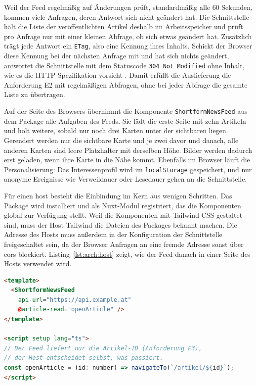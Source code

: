 Weil der Feed regelmäßig auf Änderungen prüft, standardmäßig alle 60 Sekunden, kommen viele Anfragen, deren Antwort sich nicht geändert hat.
Die Schnittstelle hält die Liste der veröffentlichten Artikel deshalb im Arbeitsspeicher und prüft pro Anfrage nur mit einer kleinen Abfrage, ob sich etwas geändert hat.
Zusätzlich trägt jede Antwort ein \texttt{ETag}, also eine Kennung ihres Inhalts.
Schickt der Browser diese Kennung bei der nächsten Anfrage mit und hat sich nichts geändert, antwortet die Schnittstelle mit dem Statuscode \texttt{304 Not Modified} ohne Inhalt, wie es die HTTP-Spezifikation vorsieht \cite{rfc9110}.
Damit erfüllt die Auslieferung die Anforderung E2 mit regelmäßigen Abfragen, ohne bei jeder Abfrage die gesamte Liste zu übertragen.

Auf der Seite des Browsers übernimmt die Komponente \texttt{ShortformNewsFeed} aus dem Package alle Aufgaben des Feeds.
Sie lädt die erste Seite mit zehn Artikeln und holt weitere, sobald nur noch drei Karten unter der sichtbaren liegen.
Gerendert werden nur die sichtbare Karte und je zwei davor und danach, alle anderen Karten sind leere Platzhalter mit derselben Höhe.
Bilder werden dadurch erst geladen, wenn ihre Karte in die Nähe kommt.
Ebenfalls im Browser läuft die Personalisierung: Das Interessenprofil wird im \texttt{localStorage} gespeichert, und nur anonyme Ereignisse wie Verweildauer oder Lesedauer gehen an die Schnittstelle.

Für einen \gls{host} besteht die Einbindung im Kern aus wenigen Schritten.
Das Package wird installiert und als Nuxt-Modul registriert, das die Komponenten global zur Verfügung stellt.
Weil die Komponenten mit Tailwind CSS gestaltet sind, muss der Host Tailwind die Dateien des Packages bekannt machen.
Die Adresse des Hosts muss außerdem in der Konfiguration der Schnittstelle freigeschaltet sein, da der Browser Anfragen an eine fremde Adresse sonst über \gls{cors} blockiert.
Listing~\ref{lst:arch:host} zeigt, wie der Feed danach in einer Seite des Hosts verwendet wird.

\begin{lstlisting}[language=HTML,caption={Einbindung des Feeds in eine Seite der Host-Website},label=lst:arch:host]
<template>
  <ShortformNewsFeed
    api-url="https://api.example.at"
    @article-read="openArticle" />
</template>

<script setup lang="ts">
// Der Feed liefert nur die Artikel-ID (Anforderung F3),
// der Host entscheidet selbst, was passiert.
const openArticle = (id: number) => navigateTo(`/artikel/${id}`);
</script>
\end{lstlisting}

